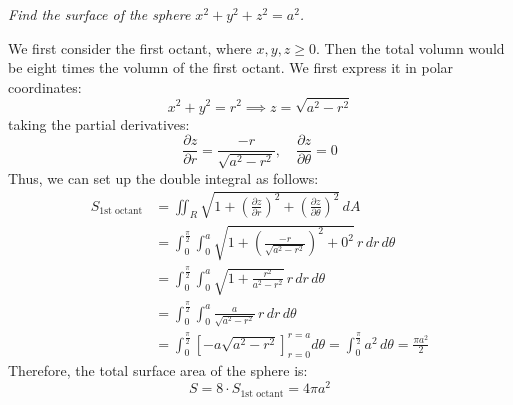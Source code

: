 \documentclass[11pt]{report}
\begin{document}
\begin{example}
    \textit{Find the surface of the sphere $x^2 + y^2 + z^2 = a^2$. }

    We first consider the first octant, where $x, y, z \ge 0$. Then the total volumn would be eight times the volumn of the first octant. We first express it in polar coordinates:
    $$
        x^2 + y^2 = r^2 \implies z = \sqrt{a^2 - r^2}
    $$
    taking the partial derivatives:
    $$
        \frac{\partial z}{\partial r} = \frac{-r}{\sqrt{a^2 - r^2}}, \quad \frac{\partial z}{\partial \theta} = 0
    $$
    Thus, we can set up the double integral as follows:
    \begin{align*}
        S_{\text{1st octant}} &= \iint_R \sqrt{1 + \left( \frac{\partial z}{\partial r} \right)^2 + \left( \frac{\partial z}{\partial \theta} \right)^2} \, dA \\
        &= \int_0^{\frac{\pi}{2}} \int_0^a \sqrt{1 + \left( \frac{-r}{\sqrt{a^2 - r^2}} \right)^2 + 0^2} \, r \, dr \, d\theta \\
        &= \int_0^{\frac{\pi}{2}} \int_0^a \sqrt{1 + \frac{r^2}{a^2 - r^2}} \, r \, dr \, d\theta \\
        &= \int_0^{\frac{\pi}{2}} \int_0^a \frac{a}{\sqrt{a^2 - r^2}} \, r \, dr \, d\theta \\
        &= \int_0^{\frac{\pi}{2}} \left[ -a \sqrt{a^2 - r^2} \right]_{r=0}^{r=a} d\theta = \int_0^{\frac{\pi}{2}} a^2 \, d\theta = \frac{\pi a^2}{2}
    \end{align*}
    Therefore, the total surface area of the sphere is:
    $$        
        S = 8 \cdot S_{\text{1st octant}} = 4\pi a^2 
    $$   
\end{example}
\end{document}
